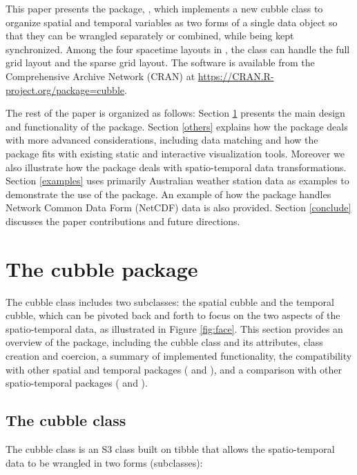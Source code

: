 \documentclass[
  shortnames]{jss}
\begin{document}
This paper presents the  package, , which implements a new cubble class to organize spatial and temporal variables as two forms of a single data object so that they can be wrangled separately or combined, while being kept synchronized. Among the four spacetime layouts in \citet{spacetime}, the  class can handle the full grid layout and the sparse grid layout. The software is available from the Comprehensive  Archive Network (CRAN) at \url{https://CRAN.R-project.org/package=cubble}.

The rest of the paper is organized as follows: Section \ref{cubble} presents the main design and functionality of the  package. Section \ref{others} explains how the  package deals with more advanced considerations, including data matching and how the package fits with existing static and interactive visualization tools. Moreover we also illustrate how the  package deals with spatio-temporal data transformations. Section \ref{examples} uses primarily Australian weather station data as examples to demonstrate the use of the package. An example of how the  package handles Network Common Data Form (NetCDF) data is also provided. Section \ref{conclude} discusses the paper contributions and future directions.

\hypertarget{cubble}{%
\section{The cubble package}\label{cubble}}

The cubble class includes two subclasses: the spatial cubble and the temporal cubble, which can be pivoted back and forth to focus on the two aspects of the spatio-temporal data, as illustrated in Figure \ref{fig:face}. This section provides an overview of the  package, including the cubble class and its attributes, class creation and coercion, a summary of implemented functionality, the compatibility with other spatial and temporal packages ( and ), and a comparison with other spatio-temporal packages ( and ).

\hypertarget{sec-cb-object}{%
\subsection{The cubble class}\label{sec-cb-object}}

The cubble class is an S3 class built on tibble that allows the spatio-temporal data to be wrangled in two forms (subclasses):
\end{document}
